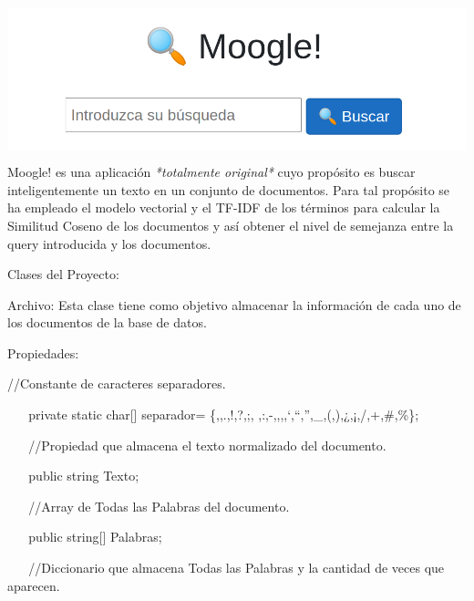 \documentclass[
]{article}
\author{}
\date{}
\begin{document}
\includegraphics[width=5.90556in,height=1.83889in]{media/image1.png}Moogle!
es una aplicación \emph{*totalmente original*} cuyo propósito es buscar
inteligentemente un texto en un conjunto de documentos. Para tal
propósito se ha empleado el modelo vectorial y el TF-IDF de los términos
para calcular la Similitud Coseno de los documentos y así obtener el
nivel de semejanza entre la query introducida y los documentos.

Clases del Proyecto:

Archivo: Esta clase tiene como objetivo almacenar la información de cada
uno de los documentos de la base de datos.

Propiedades:

//Constante de caracteres separadores.

~ ~ private static char{[}{]} separador=
\{\textquotesingle,\textquotesingle,\textquotesingle.\textquotesingle,\textquotesingle!\textquotesingle,\textquotesingle?\textquotesingle,\textquotesingle;\textquotesingle,\textquotesingle{}
\textquotesingle,\textquotesingle:\textquotesingle,\textquotesingle-\textquotesingle,\textquotesingle*\textquotesingle,\textquotesingle{[}\textquotesingle,\textquotesingle{]}\textquotesingle,\textquotesingle`\textquotesingle,\textquotesingle``\textquotesingle,\textquotesingle''\textquotesingle,\textquotesingle\_\textquotesingle,\textquotesingle(\textquotesingle,\textquotesingle)\textquotesingle,\textquotesingle¿\textquotesingle,\textquotesingle¡\textquotesingle,\textquotesingle/\textquotesingle,\textquotesingle+\textquotesingle,\textquotesingle\#\textquotesingle,\textquotesingle\%\textquotesingle\};

~ ~ //Propiedad que almacena el texto normalizado del documento.

~ ~ public string Texto;

~ ~ //Array de Todas las Palabras del documento.

~ ~ public string{[}{]} Palabras;

~ ~ //Diccionario que almacena Todas las Palabras y la cantidad de veces
que aparecen.
\end{document}
